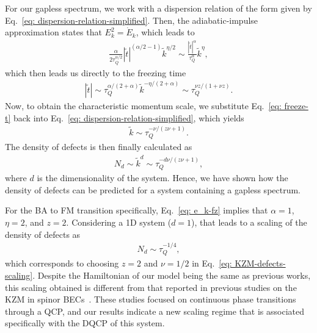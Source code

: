 For our gapless spectrum, we work with a dispersion relation of the form given
by Eq.~\eqref{eq: dispersion-relation-simplified}.
Then, the adiabatic-impulse approximation states that \(E_k^2 = \dot{E}_k\),
which leads to
\begin{align}
    \frac{\alpha}{2\tau_Q^{\alpha/2}}|\tilde{t}|^{(\alpha/2 - 1)}
    \tilde{k}^{\eta/2} \sim \frac{|\tilde{t}|^{\alpha}}{\tau_Q^{\alpha}}
    \tilde{k}^{\eta},
\end{align}
which then leads us directly to the freezing time
\begin{align}\label{eq: freeze-t}   
    |\tilde{t}| \sim \tau_Q^{\alpha/(2+\alpha)}
    \tilde{k}^{-\eta/(2+\alpha)} \sim
    \tau_Q^{\nu z/(1+\nu z)}.
\end{align}
Now, to obtain the characteristic momentum scale, we substitute
Eq.~\eqref{eq: freeze-t} back into
Eq.~\eqref{eq: dispersion-relation-simplified}, which yields
\begin{align}
    \tilde{k} \sim \tau_Q^{-\nu/(z\nu + 1)}.
\end{align}
The density of defects is then finally calculated as
\begin{align}
    N_d \sim \tilde{k}^d \sim \tau_Q^{-d\nu/(z\nu + 1)},
\end{align}
where \(d\) is the dimensionality of the system.
Hence, we have shown how the density of defects can be predicted for a system
containing a gapless spectrum.

For the BA to FM transition specifically, Eq.~\eqref{eq: e_k-fz} implies that
\(\alpha=1\), \(\eta=2\), and \(z = 2\).
Considering a 1D system (\(d = 1\)), that leads to a scaling of the density of
defects as
\begin{align}\label{eq: BA-FM-defects-scaling}
    N_d \sim\tau_Q^{-1/4},
\end{align}
which corresponds to choosing \(z=2\) and \(\nu = 1/2\) in
Eq.~\eqref{eq: KZM-defects-scaling}.
Despite the Hamiltonian of our model being the same as previous works, this
scaling obtained is different from that reported in previous studies on the KZM
in spinor BECs~\cite{Damski2007,Saito2007,Saito2007a,Saito2013,Swislocki2013}.
These studies focused on continuous phase transitions through a QCP\@, and our
results indicate a new scaling regime that is associated specifically with the
DQCP of this system.

